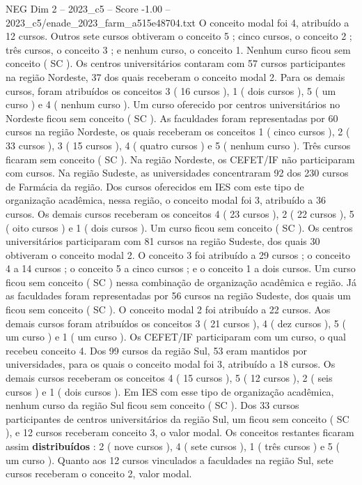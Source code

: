 \begin{textsample}{NEG Dim 2 – 2023\_c5 – Score -1.00 – 2023\_c5/enade\_2023\_farm\_a515e48704.txt}
O conceito modal foi 4, atribuído a 12 cursos.
Outros sete cursos obtiveram o conceito 5 ; cinco cursos, o conceito 2 ; três cursos, o conceito 3 ; e nenhum curso, o conceito 1.
Nenhum curso ficou sem conceito ( SC ).
Os centros universitários contaram com 57 cursos participantes na região Nordeste, 37 dos quais receberam o conceito modal 2.
Para os demais cursos, foram atribuídos os conceitos 3 ( 16 cursos ), 1 ( dois cursos ), 5 ( um curso ) e 4 ( nenhum curso ).
Um curso oferecido por centros universitários no Nordeste ficou sem conceito ( SC ).
As faculdades foram representadas por 60 cursos na região Nordeste, os quais receberam os conceitos 1 ( cinco cursos ), 2 ( 33 cursos ), 3 ( 15 cursos ), 4 ( quatro cursos ) e 5 ( nenhum curso ).
Três cursos ficaram sem conceito ( SC ).
Na região Nordeste, os CEFET/IF não participaram com cursos.
Na região Sudeste, as universidades concentraram 92 dos 230 cursos de Farmácia da região.
Dos cursos oferecidos em IES com este tipo de organização acadêmica, nessa região, o conceito modal foi 3, atribuído a 36 cursos.
Os demais cursos receberam os conceitos 4 ( 23 cursos ), 2 ( 22 cursos ), 5 ( oito cursos ) e 1 ( dois cursos ).
Um curso ficou sem conceito ( SC ).
Os centros universitários participaram com 81 cursos na região Sudeste, dos quais 30 obtiveram o conceito modal 2.
O conceito 3 foi atribuído a 29 cursos ; o conceito 4 a 14 cursos ; o conceito 5 a cinco cursos ; e o conceito 1 a dois cursos.
Um curso ficou sem conceito ( SC ) nessa combinação de organização acadêmica e região.
Já as faculdades foram representadas por 56 cursos na região Sudeste, dos quais um ficou sem conceito ( SC ).
O conceito modal 2 foi atribuído a 22 cursos.
Aos demais cursos foram atribuídos os conceitos 3 ( 21 cursos ), 4 ( dez cursos ), 5 ( um curso ) e 1 ( um curso ).
Os CEFET/IF participaram com um curso, o qual recebeu conceito 4.
Dos 99 cursos da região Sul, 53 eram mantidos por universidades, para os quais o conceito modal foi 3, atribuído a 18 cursos.
Os demais cursos receberam os conceitos 4 ( 15 cursos ), 5 ( 12 cursos ), 2 ( seis cursos ) e 1 ( dois cursos ).
Em IES com esse tipo de organização acadêmica, nenhum curso da região Sul ficou sem conceito ( SC ).
Dos 33 cursos participantes de centros universitários da região Sul, um ficou sem conceito ( SC ), e 12 cursos receberam conceito 3, o valor modal.
Os conceitos restantes ficaram assim \textbf{distribuídos} : 2 ( nove cursos ), 4 ( sete cursos ), 1 ( três cursos ) e 5 ( um curso ).
Quanto aos 12 cursos vinculados a faculdades na região Sul, sete cursos receberam o conceito 2, valor modal.

\end{textsample}
